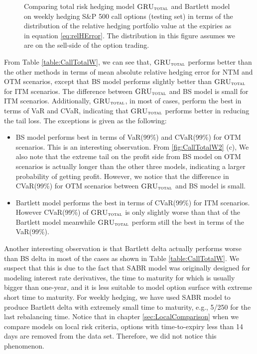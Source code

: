 \documentclass[letterpaper,12pt,titlepage,oneside,final]{book}
\numberwithin{equation}{section}
\theoremstyle{definition}
\newcommand{\modelT}{\textsc{GRU}_{\textsc{total}}}
\begin{document}
\begin{figure}[htp!]
	\caption{Comparing total risk hedging model $\modelT$ and Bartlett model on weekly hedging S\&P 500 call options (testing set) in terms of the distribution of the  relative hedging portfolio value at the expiries as in equation \eqref{eq:relHError}. The distribution in this figure assumes we are on the sell-side of the option trading.} \label{fig:CallTotalW3}
\end{figure}

From Table \ref{table:CallTotalW}, we can see that, $\modelT$ performs better than the other  methods in terms of 
mean absolute relative hedging error for NTM and OTM scenarios, except that BS model performs slightly better than   $\modelT$ for ITM scenarios. The difference between  $\modelT$  and BS model is small for ITM scenarios. Additionally, $\modelT$, in most of cases, perform the best in terms of VaR and CVaR, indicating that $\modelT$ performs better in reducing the tail loss.  The exceptions is given as the following:
\begin{itemize}
	\item  BS model performs best in terms of  VaR(99\%) and  CVaR(99\%) for OTM scenarios. This is an interesting observation. From \ref{fig:CallTotalW2} (c), We also note that the extreme tail on the profit side from BS model on OTM scenarios is actually longer than the other three models, indicating a larger probability of getting  profit. However, we notice that the difference in  CVaR(99\%) for OTM scenarios between  $\modelT$ and BS model is small. 
	\item Bartlett model performs the best in terms of  CVaR(99\%) for ITM scenarios. However CVaR(99\%)  of $\modelT$ is only slightly worse than that of the Bartlett model meanwhile $\modelT$ perform still the best in terms of   the VaR(99\%).
\end{itemize}

Another interesting observation is that Bartlett delta actually performs worse than BS delta in most of the cases as shown in Table \ref{table:CallTotalW}. We suspect that this is due to the fact that SABR model was originally designed for modeling interest rate derivatives, the time to maturity for which is usually bigger than one-year, and it is less suitable to model option surface with extreme short time to maturity\cite{chen2011calibration}. For weekly hedging, we have used SABR model to produce Bartlett delta with extremely small time to maturity, e.g., 5/250 for the last rebalancing time.
Notice that in chapter \ref{sec:LocalComparison} when we compare models on local risk criteria, options with time-to-expiry less than 14 days are removed from the data set. Therefore, we did not notice this phenomenon.
\end{document}
